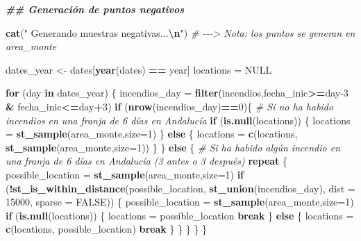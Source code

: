 \documentclass[12pt,a4paper,]{book}
\newenvironment{Shaded}{\begin{snugshade}}{\end{snugshade}}
\newcommand{\AttributeTok}[1]{\textcolor[rgb]{0.13,0.29,0.53}{#1}}
\newcommand{\CommentTok}[1]{\textcolor[rgb]{0.56,0.35,0.01}{\textit{#1}}}
\newcommand{\ConstantTok}[1]{\textcolor[rgb]{0.56,0.35,0.01}{#1}}
\newcommand{\ControlFlowTok}[1]{\textcolor[rgb]{0.13,0.29,0.53}{\textbf{#1}}}
\newcommand{\DecValTok}[1]{\textcolor[rgb]{0.00,0.00,0.81}{#1}}
\newcommand{\DocumentationTok}[1]{\textcolor[rgb]{0.56,0.35,0.01}{\textbf{\textit{#1}}}}
\newcommand{\FunctionTok}[1]{\textcolor[rgb]{0.13,0.29,0.53}{\textbf{#1}}}
\newcommand{\NormalTok}[1]{#1}
\newcommand{\OtherTok}[1]{\textcolor[rgb]{0.56,0.35,0.01}{#1}}
\newcommand{\SpecialCharTok}[1]{\textcolor[rgb]{0.81,0.36,0.00}{\textbf{#1}}}
\newcommand{\StringTok}[1]{\textcolor[rgb]{0.31,0.60,0.02}{#1}}
\numberwithin{dummy}{section}
\theoremstyle{ocrenumbox}
\theoremstyle{blacknumex}
\theoremstyle{blacknumbox}
\theoremstyle{ocrenum}
\theoremstyle{ocrenum}
\begin{document}
\begin{Shaded}
\begin{Highlighting}[]
  \DocumentationTok{\#\# Generación de puntos negativos}
  
  \FunctionTok{cat}\NormalTok{(}\StringTok{"  Generando muestras negativas...}\SpecialCharTok{\textbackslash{}n}\StringTok{"}\NormalTok{)}
  \CommentTok{\# {-}{-}{-}\textgreater{} Nota: los puntos se generan en area\_monte}
  
\NormalTok{  dates\_year }\OtherTok{\textless{}{-}}\NormalTok{ dates[}\FunctionTok{year}\NormalTok{(dates) }\SpecialCharTok{==}\NormalTok{ year]}
\NormalTok{  locations }\OtherTok{=} \ConstantTok{NULL}
  
  \ControlFlowTok{for}\NormalTok{ (day }\ControlFlowTok{in}\NormalTok{ dates\_year) \{}
\NormalTok{    incendios\_day }\OtherTok{=} \FunctionTok{filter}\NormalTok{(incendios,fecha\_inic}\SpecialCharTok{\textgreater{}=}\NormalTok{day}\DecValTok{{-}3} \SpecialCharTok{\&}\NormalTok{ fecha\_inic}\SpecialCharTok{\textless{}=}\NormalTok{day}\SpecialCharTok{+}\DecValTok{3}\NormalTok{)}
    \ControlFlowTok{if}\NormalTok{ (}\FunctionTok{nrow}\NormalTok{(incendios\_day)}\SpecialCharTok{==}\DecValTok{0}\NormalTok{)\{ }\CommentTok{\# Si no ha habido incendios en una franja de 6 días en Andalucía}
      \ControlFlowTok{if}\NormalTok{ (}\FunctionTok{is.null}\NormalTok{(locations)) \{}
\NormalTok{        locations }\OtherTok{=} \FunctionTok{st\_sample}\NormalTok{(area\_monte,}\AttributeTok{size=}\DecValTok{1}\NormalTok{)}
\NormalTok{      \} }\ControlFlowTok{else}\NormalTok{ \{}
\NormalTok{        locations }\OtherTok{=} \FunctionTok{c}\NormalTok{(locations, }\FunctionTok{st\_sample}\NormalTok{(area\_monte,}\AttributeTok{size=}\DecValTok{1}\NormalTok{))}
\NormalTok{      \}}
\NormalTok{    \} }\ControlFlowTok{else}\NormalTok{ \{ }\CommentTok{\# Si ha habido algún incendio en una franja de 6 días en Andalucía (3 antes o 3 después)}
      \ControlFlowTok{repeat}\NormalTok{ \{}
\NormalTok{        possible\_location }\OtherTok{=} \FunctionTok{st\_sample}\NormalTok{(area\_monte,}\AttributeTok{size=}\DecValTok{1}\NormalTok{)}
        \ControlFlowTok{if}\NormalTok{ (}\SpecialCharTok{!}\FunctionTok{st\_is\_within\_distance}\NormalTok{(possible\_location, }
                                   \FunctionTok{st\_union}\NormalTok{(incendios\_day), }
                                   \AttributeTok{dist =} \DecValTok{15000}\NormalTok{, }\AttributeTok{sparse =} \ConstantTok{FALSE}\NormalTok{)) \{}
\NormalTok{          possible\_location }\OtherTok{=} \FunctionTok{st\_sample}\NormalTok{(area\_monte,}\AttributeTok{size=}\DecValTok{1}\NormalTok{)}
          \ControlFlowTok{if}\NormalTok{ (}\FunctionTok{is.null}\NormalTok{(locations)) \{}
\NormalTok{            locations }\OtherTok{=}\NormalTok{ possible\_location}
            \ControlFlowTok{break}
\NormalTok{          \} }\ControlFlowTok{else}\NormalTok{ \{}
\NormalTok{            locations }\OtherTok{=} \FunctionTok{c}\NormalTok{(locations, possible\_location)}
            \ControlFlowTok{break}
\NormalTok{          \}}
\NormalTok{        \}}
\NormalTok{      \}}
\NormalTok{    \}}
\NormalTok{  \}}
  

\end{Highlighting}
\end{Shaded}
\end{document}
